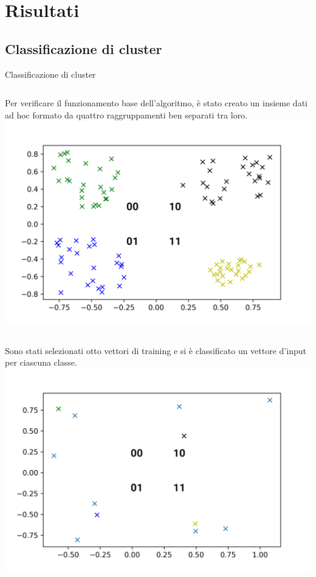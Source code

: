 \documentclass{beamer}
\begin{document}
    \section*{Risultati}
    \subsection{Classificazione di cluster}

    \begin{frame}{Classificazione di cluster}
        \begin{columns}
            Per verificare il funzionamento base dell'algoritmo, è stato creato un insieme dati ad hoc formato da quattro raggruppamenti ben separati tra loro. 
            \includegraphics[width=\columnwidth]{gfx/Clusters/cluster_numbered.png}
    \end{columns}

    \begin{columns}
        Sono stati selezionati otto vettori di training 
        e si è classificato un vettore d'input per ciascuna classe. 
        \includegraphics[width=\columnwidth]{gfx/Clusters/random_numbered.png}            
    \end{columns}
    \end{frame}
\end{document}
